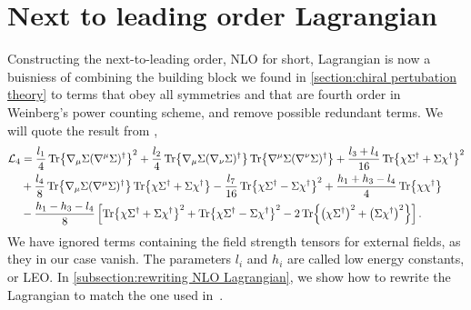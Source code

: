 \section{Next to leading order Lagrangian}

Constructing the next-to-leading order, NLO for short, Lagrangian is now a buisniess of combining the building block we found in \autoref{section:chiral pertubation theory} to terms that obey all symmetries and that are fourth order in Weinberg's power counting scheme, and remove possible redundant terms.
We will quote the result from \cite{Scherer2002IntroductionTC},
\begin{align}
    \notag
    \mathcal{L}_4 
    & = 
    \frac{l_1}{4} \Tr{\nabla_\mu \Sigma (\nabla^\mu \Sigma)^\dagger}^2
    + \frac{l_2}{4} \Tr{\nabla_\mu \Sigma (\nabla_\nu \Sigma)^\dagger} 
    \Tr{\nabla^\mu \Sigma (\nabla^\nu \Sigma)^\dagger} 
    +
    \frac{l_3 + l_4}{16} \Tr{\chi \Sigma^\dagger + \Sigma \chi^\dagger}^2
    \\ \notag
    &
    + \frac{l_4}{8}\Tr{\nabla_\mu \Sigma (\nabla^\mu \Sigma)^\dagger} \Tr{\chi \Sigma^\dagger + \Sigma \chi^\dagger}
    - \frac{l_7}{16} \Tr{\chi \Sigma^\dagger - \Sigma \chi^\dagger}^2
    + \frac{h_1 + h_3 - l_4}{4} \Tr{\chi \chi^\dagger} \\
    & -
    \frac{h_1 - h_3 - l_4}{8} 
    \left[
        \Tr{\chi \Sigma^\dagger + \Sigma \chi^\dagger}^2
        + \Tr{\chi \Sigma^\dagger - \Sigma \chi^\dagger}^2
        -2 \Tr{\left(\chi \Sigma^\dagger\right)^2 + \left( \Sigma \chi^\dagger\right)^2}
    \right]
    \label{NLO Lagrangian}.
\end{align}
We have ignored terms containing the field strength tensors for external fields, as they in our case vanish.
The parameters $l_i$ and $h_i$ are called low energy constants, or LEO.
In \autoref{subsection:rewriting NLO Lagrangian}, we show how to rewrite the Lagrangian to match the one used in~\cite{Andersen:two-flavor-chpt,mojahed}.
 
